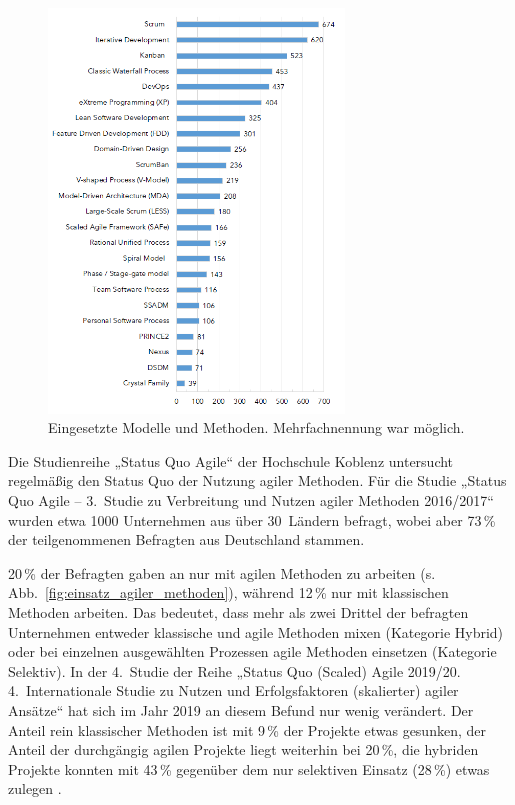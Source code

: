 \begin{figure}[h!]
    \centering
    \includegraphics[width=0.7\textwidth]{Bilder/Kapitel-2/VerteilungModelleMethoden.png}
    \caption[Eingesetzte Vorgehensmodelle und Methoden]{Eingesetzte Modelle und Methoden. Mehrfachnennung war möglich. \cite[10]{kuh18}}
    \label{fig:softwareentwicklungsmodelle_und_methoden}
\end{figure}

Die Studienreihe „Status Quo Agile“ der Hochschule Koblenz untersucht regelmäßig den Status Quo der Nutzung agiler Methoden. Für die Studie „Status Quo Agile – 3.~Studie zu Verbreitung und Nutzen agiler Methoden 2016/2017“ \cite{kom17} wurden etwa 1000 Unternehmen aus über 30~Ländern befragt, wobei aber 73\,\% der teilgenommenen Befragten aus Deutschland stammen. 

\pagebreak %

20\,\% der Befragten gaben an nur mit agilen Methoden zu arbeiten (s. Abb.~\ref{fig:einsatz_agiler_methoden}), während 12\,\% nur mit klassischen Methoden arbeiten. Das bedeutet, dass mehr als zwei Drittel der befragten Unternehmen entweder klassische und agile Methoden mixen (Kategorie Hybrid) oder bei einzelnen ausgewählten Prozessen agile Methoden einsetzen (Kategorie Selektiv). In der 4.~Studie der Reihe „Status Quo (Scaled) Agile 2019/20. 4.~Internationale Studie zu Nutzen und Erfolgsfaktoren (skalierter) agiler Ansätze“ \cite{kom20} hat sich im Jahr 2019 an diesem Befund nur wenig verändert. Der Anteil rein klassischer Methoden ist mit 9\,\% der Projekte etwas gesunken, der Anteil der durchgängig agilen Projekte liegt weiterhin bei 20\,\%, die hybriden Projekte konnten mit 43\,\% gegenüber dem nur selektiven Einsatz (28\,\%) etwas zulegen \cite[13]{kom20}.

